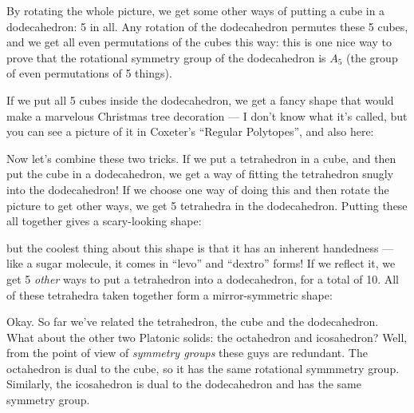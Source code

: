 \documentclass{article}
\def\tightlist{}
\renewcommand{\texttt}[1]{%
  \begingroup
  \ttfamily
  \begingroup\lccode`~=`/\lowercase{\endgroup\def~}{/\discretionary{}{}{}}%
  \begingroup\lccode`~=`[\lowercase{\endgroup\def~}{[\discretionary{}{}{}}%
  \begingroup\lccode`~=`.\lowercase{\endgroup\def~}{.\discretionary{}{}{}}%
  \catcode`/=\active\catcode`[=\active\catcode`.=\active
  \scantokens{#1\noexpand}%
  \endgroup
}
\begin{document}
By rotating the whole picture, we get some other ways of putting a cube
in a dodecahedron: 5 in all. Any rotation of the dodecahedron permutes
these 5 cubes, and we get all even permutations of the cubes this way:
this is one nice way to prove that the rotational symmetry group of the
dodecahedron is \(A_5\) (the group of even permutations of 5 things).

If we put all 5 cubes inside the dodecahedron, we get a fancy shape that
would make a marvelous Christmas tree decoration --- I don't know what
it's called, but you can see a picture of it in Coxeter's ``Regular
Polytopes'', and also here:


Now let's combine these two tricks. If we put a tetrahedron in a cube,
and then put the cube in a dodecahedron, we get a way of fitting the
tetrahedron snugly into the dodecahedron! If we choose one way of doing
this and then rotate the picture to get other ways, we get 5 tetrahedra
in the dodecahedron. Putting these all together gives a scary-looking
shape:


but the coolest thing about this shape is that it has an inherent
handedness --- like a sugar molecule, it comes in ``levo'' and
``dextro'' forms! If we reflect it, we get 5 \emph{other} ways to put a
tetrahedron into a dodecahedron, for a total of 10. All of these
tetrahedra taken together form a mirror-symmetric shape:


Okay. So far we've related the tetrahedron, the cube and the
dodecahedron. What about the other two Platonic solids: the octahedron
and icosahedron? Well, from the point of view of \emph{symmetry groups}
these guys are redundant. The octahedron is dual to the cube, so it has
the same rotational symmmetry group. Similarly, the icosahedron is dual
to the dodecahedron and has the same symmetry group.
\end{document}
